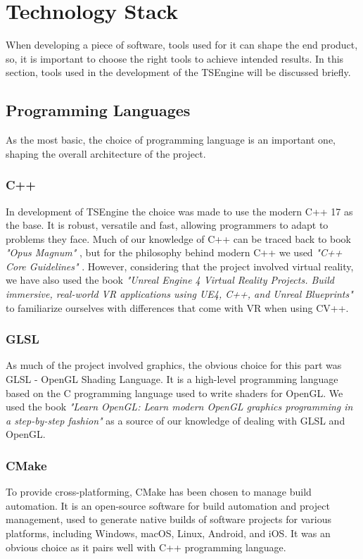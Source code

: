 \newpage
\section{Technology Stack}
\hspace{\parindent}
When developing a piece of software, tools used for it can shape the end product, so, it is important to choose the right tools to achieve intended results. In this section, tools used in the development of the TSEngine will be discussed briefly.

\subsection{Programming Languages}
\hspace{\parindent}
As the most basic, the choice of programming language is an important one, shaping the overall architecture of the project.
\subsubsection{C++}
\hspace{\parindent}
In development of TSEngine the choice was made to use the modern C++ 17 as the base. It is robust, versatile and fast, allowing programmers to adapt to problems they face. Much of our knowledge of C++ can be traced back to book \textit{"Opus Magnum"} \cite{OpusMagnum}, but for the philosophy behind modern C++ we used \textit{"C++ Core Guidelines"} \cite{CppCoreGuidelines}. However, considering that the project involved virtual reality, we have also used the book \textit{"Unreal Engine 4 Virtual Reality Projects. Build immersive, real-world VR applications using UE4, C++, and Unreal Blueprints"} \cite{UE4VRProjects} to familiarize ourselves with differences that come with VR when using CV++. 
\subsubsection{GLSL}
\hspace{\parindent}
\label{sec:glsl}
As much of the project involved graphics, the obvious choice for this part was GLSL - OpenGL Shading Language. It is a high-level programming language based on the C programming language used to write shaders for OpenGL. We used the book \textit{"Learn OpenGL: Learn modern OpenGL graphics programming in a step-by-step fashion"} \cite{learnopengl} as a source of our knowledge of dealing with GLSL and OpenGL.

\subsubsection{CMake}
\hspace{\parindent}
\label{sec:stack_cmake}
To provide cross-platforming, CMake has been chosen to manage build automation. It is an open-source software for build automation and project management, used to generate native builds of software projects for various platforms, including Windows, macOS, Linux, Android, and iOS. It was an obvious choice as it pairs well with C++ programming language.

